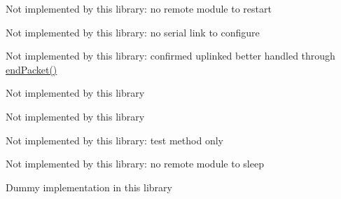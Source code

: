\begin{DoxyRefList}
%
 Not implemented by this library\+: no remote module to restart  
\item[Member \mbox{\hyperlink{classSTM32LoRaWAN_a9a54edbb78e6b782204b2d37bed84c96}{S\+T\+M32\+Lo\+Ra\+W\+AN::set\+Baud}} (unsigned long baud)]\label{extensions__extensions000013}%
%
 Not implemented by this library\+: no serial link to configure  
\item[Member \mbox{\hyperlink{classSTM32LoRaWAN_a999c98c64e466aedf9fa2e848e684018}{S\+T\+M32\+Lo\+Ra\+W\+AN::set\+C\+FM}} (bool cfm)]\label{extensions__extensions000008}%
%
 Not implemented by this library\+: confirmed uplinked better handled through \mbox{\hyperlink{classSTM32LoRaWAN_a816dd9c8b223bda9380971c5a1dab377}{end\+Packet()}}  
\item[Member \mbox{\hyperlink{classSTM32LoRaWAN_a29b18acfa3074157c501122b9399d1d1}{S\+T\+M32\+Lo\+Ra\+W\+AN::set\+F\+CD}} (uint16\+\_\+t fcd)]\label{extensions__extensions000006}%
%
 Not implemented by this library  
\item[Member \mbox{\hyperlink{classSTM32LoRaWAN_ab1f8b82511bb880e253f7bdf4e194023}{S\+T\+M32\+Lo\+Ra\+W\+AN::set\+F\+CU}} (uint16\+\_\+t fcu)]\label{extensions__extensions000004}%
%
 Not implemented by this library  
\item[Member \mbox{\hyperlink{classSTM32LoRaWAN_a2eb7351c1b7e8ada59ba58e8032c6a83}{S\+T\+M32\+Lo\+Ra\+W\+AN::set\+T\+Conf}} (String params)]\label{extensions__extensions000015}%
%
 Not implemented by this library\+: test method only  
\item[Member \mbox{\hyperlink{classSTM32LoRaWAN_a9d332d013d0a2569bc162568adb1bd04}{S\+T\+M32\+Lo\+Ra\+W\+AN::sleep}} (bool on=true)]\label{extensions__extensions000019}%
%
 Not implemented by this library\+: no remote module to sleep  
\item[Member \mbox{\hyperlink{classSTM32LoRaWAN_ab3dd6a10e89c4e94474b85aa4da0a302}{S\+T\+M32\+Lo\+Ra\+W\+AN::version}} ()]\label{extensions__extensions000031}%
%
 Dummy implementation in this library 
\end{DoxyRefList}